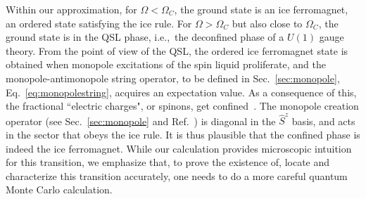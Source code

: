 \documentclass[twocolumn,superscriptaddress,amsmath,amssymb,aps,prx,nofootinbib]{revtex4-2}
\begin{document}
Within our approximation, for $\Omega<\Omega_C$, the ground state is an ice ferromagnet, an ordered state satisfying the ice rule. For $\Omega> \Omega_C$ but also close to $\Omega_C$, the ground state is in the QSL phase, i.e.,~the deconfined phase of a $U(1)$ gauge theory.  From the point of view of the QSL, the ordered ice ferromagnet state is obtained when monopole excitations of the spin liquid proliferate, and the monopole-antimonopole string operator, to be defined in Sec.~\ref{sec:monopole}, Eq.~\eqref{eq:monopolestring}, acquires an expectation value. As a consequence of this, the fractional ``electric charges", or spinons, get confined~\cite{polyakovCompactGaugeFields1975,polyakov1977}. The monopole creation operator (see Sec.~\ref{sec:monopole} and Ref.~\cite{hermele2004}) is diagonal in the $\hat{S}^z$ basis, and acts in the sector that obeys the ice rule. It is thus plausible that the confined phase is indeed the ice ferromagnet. While our calculation provides microscopic intuition for this transition, we emphasize that, to prove the existence of, locate and characterize this transition accurately, one needs to do a more careful quantum Monte Carlo calculation.
\end{document}
